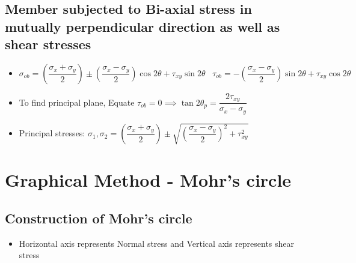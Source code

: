 \documentclass[8pt]{report}
\begin{document}
	\subsection{Member subjected to Bi-axial stress in mutually perpendicular direction as well as shear stresses}
		\begin{itemize}
			\item $\boxed{\sigma_{ob} = \left(\dfrac{\sigma_x+\sigma_y}{2}\right)\pm \left(\dfrac{\sigma_x-\sigma_y}{2}\right)\cos 2\theta+\tau_{xy}\sin 2\theta}\;\;\;\boxed{\tau_{ob} = -\left(\dfrac{\sigma_x-\sigma_y}{2}\right)\sin 2\theta+\tau_{xy}\cos 2\theta}$
			\item To find principal plane, Equate $\tau_{ob} = 0 \implies \boxed{\tan 2\theta_p = \dfrac{2\tau_{xy}}{\sigma_x-\sigma_y}}$
			\item Principal stresses: $\boxed{\sigma_1,\sigma_2 = \left(\dfrac{\sigma_x+\sigma_y}{2}\right)\pm\sqrt{\left(\dfrac{\sigma_x-\sigma_y}{2}\right)^2+\tau_{xy}^2}}$
		\end{itemize}\hrulefill
	\section{Graphical Method - Mohr's circle}
		\subsection{Construction of Mohr's circle}
			\begin{itemize}
				\item Horizontal axis represents Normal stress and Vertical axis represents shear stress
			\end{itemize}\hrulefill
\end{document}

